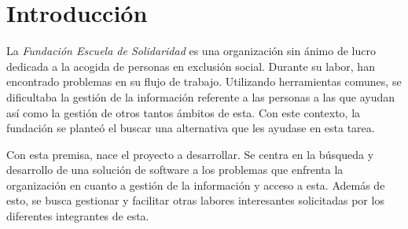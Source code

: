 \chapter{Introducción}

La \textit{Fundación Escuela de Solidaridad} es una organización sin ánimo de lucro dedicada a la acogida de personas en exclusión social. Durante su labor, han encontrado problemas en su flujo de trabajo. Utilizando herramientas comunes, se dificultaba la gestión de la información referente a las personas a las que ayudan así como la gestión de otros tantos ámbitos de esta. Con este contexto, la fundación se planteó el buscar una alternativa que les ayudase en esta tarea.

Con esta premisa, nace el proyecto a desarrollar. Se centra en la búsqueda y desarrollo de una solución de software a los problemas que enfrenta la organización en cuanto a gestión de la información y acceso a esta. Además de esto, se busca gestionar y facilitar otras labores interesantes solicitadas por los diferentes integrantes de esta.



